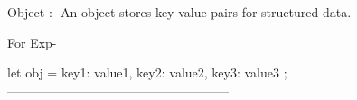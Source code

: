 Object :- An object stores key-value pairs for structured data.
    
For Exp-

let obj = {
  key1: value1,
  key2: value2,
  key3: value3
};
-----------------------------------------------------





